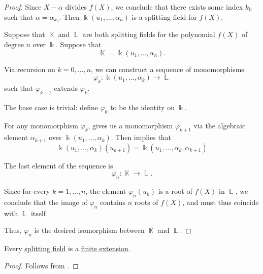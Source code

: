 \begin{proof}
  Since \( X - \alpha \) divides \( f(X) \), we conclude that there exists some index \( k_0 \) such that \( \alpha = \alpha_{k_0} \). Then \( \Bbbk(u_1, \ldots, \alpha_n) \) is a splitting field for \( f(X) \).

  \UniquenessSubProof Suppose that \( \BbbK \) and \( \BbbL \) are both splitting fields for the polynomial \( f(X) \) of degree \( n \) over \( \Bbbk \). Suppose that
  \begin{equation*}
    \BbbK = \Bbbk(u_1, \ldots, \alpha_n).
  \end{equation*}

  Via recursion on \( k = 0, \ldots, n \), we can construct a sequence of monomorphisms
  \begin{equation*}
    \varphi_k: \Bbbk(u_1, \ldots, \alpha_k) \to \BbbL
  \end{equation*}
  such that \( \varphi_{k+1} \) extends \( \varphi_k \).

  The base case is trivial: define \( \varphi_0 \) to be the identity on \( \Bbbk \).

  For any monomorphism \( \varphi_k \),  gives us a monomorphism \( \varphi_{k+1} \) via the algebraic element \( \alpha_{k+1} \) over \( \Bbbk(u_1, \ldots, \alpha_k) \). Then  implies that
  \begin{equation*}
    \Bbbk(u_1, \ldots, \alpha_k)(u_{k+1})
    =
    \Bbbk(u_1, \ldots, \alpha_k, \alpha_{k+1})
  \end{equation*}

  The last element of the sequence is
  \begin{equation*}
    \varphi_n: \BbbK \to \BbbL.
  \end{equation*}

  Since for every \( k = 1, \ldots, n \), the element \( \varphi_n(u_k) \) is a root of \( f(X) \) in \( \BbbL \), we conclude that the image of \( \varphi_n \) contains \( n \) roots of \( f(X) \), and must thus coincide with \( \BbbL \) itself.

  Thus, \( \varphi_n \) is the desired isomorphism between \( \BbbK \) and \( \BbbL \).
\end{proof}

\begin{proposition}\label{thm:splitting_field_is_finite_extension}
  Every \hyperref[def:splitting_field]{splitting field} is a \hyperref[def:field_extension_degree]{finite extension}.
\end{proposition}
\begin{proof}
  Follows from .
\end{proof}

